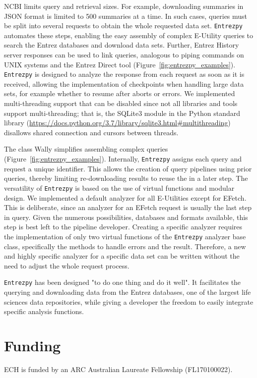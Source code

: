 \documentclass[a4paper]{article}
\newcommand{\entrezpy}{\texttt{Entrezpy}\xspace}
\begin{document}
NCBI limits query and retrieval sizes. For example, downloading summaries in
JSON format is limited to 500 summaries at a time. In such cases, queries must
be split into several requests to obtain the whole requested data set.
\entrezpy automates these steps, enabling the easy assembly of complex
E-Utility queries to search the Entrez databases and download data sets.
Further, Entrez History server responses can be used to link queries, analogous
to piping commands on UNIX systems and the Entrez Direct tool
(Figure~\ref{fig:entrezpy_examples}). \entrezpy is designed to analyze the
response from each request as soon as it is received, allowing the
implementation of checkpoints when handling large data sets, for example
whether to resume after aborts or errors. We implemented multi-threading
support that can be disabled since not all libraries and tools support
multi-threading; that is, the SQLite3 module in the Python standard library
(\url{https://docs.python.org/3.7/library/sqlite3.html#multithreading})
disallows shared connection and cursors between threads.



The class Wally simplifies assembling complex queries
(Figure~\ref{fig:entrezpy_examples}). Internally, \entrezpy assigns each query
and request a unique identifier. This allows the creation of query pipelines
using prior queries, thereby limiting re-downloading results to reuse the in a
later step. The versatility of \entrezpy is based on the use of virtual
functions and modular design. We implemented a default analyzer for all
E-Utilities except for EFetch. This is deliberate, since an analyzer for an
EFetch request is usually the last step in query. Given the numerous
possibilities, databases and formats available, this step is best left to the
pipeline developer. Creating a specific analyzer requires the implementation of
only two virtual functions of the \entrezpy analyzer base class, specifically
the methods to handle errors and the result. Therefore, a new and highly
specific analyzer for a specific data set can be written without the need to
adjust the whole request process.

\entrezpy has been designed "to do one thing and do it well". It facilitates
the querying and downloading data from the Entrez databases, one of the largest
life sciences data repositories, while giving a developer the freedom to easily
integrate specific analysis functions.

\section{Funding}
ECH is funded by an ARC Australian Laureate Fellowship (FL170100022).


\end{document}
